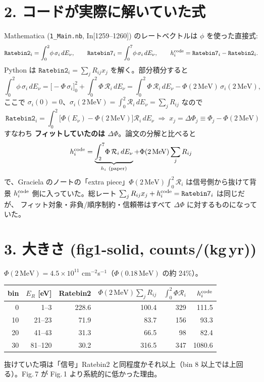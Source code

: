 \documentclass[11pt,a4paper]{ltjsarticle}
\newcommand{\Ev}{E_\nu}
\newcommand{\Phit}{\Phi(2\,\mathrm{MeV})}
\newcommand{\cR}{\mathcal{R}}
\begin{document}
\section*{2. コードが実際に解いていた式}
Mathematica (\texttt{1\_Main.nb}, In[1259--1260]) のレートベクトルは $\phi$ を使った直接式:
\begin{equation}
\texttt{Ratebin2}_i=\int_0^{2}\!\phi\,\sigma_i\,d\Ev,\qquad
\texttt{Ratebin7}_i=\int_0^{7}\!\phi\,\sigma_i\,d\Ev,\qquad
h_i^{\rm code}=\texttt{Ratebin7}_i-\texttt{Ratebin2}_i .
\end{equation}
Python は $\texttt{Ratebin2}_i=\sum_j R_{ij}x_j$ を解く。部分積分すると
\begin{equation}
\int_0^{2}\!\phi\,\sigma_i\,d\Ev
=\Big[-\Phi\,\sigma_i\Big]_0^{2}+\int_0^{2}\!\Phi\,\cR_i\,d\Ev
=\int_0^{2}\!\Phi\,\cR_i\,d\Ev-\Phit\,\sigma_i(2\,\mathrm{MeV}),
\end{equation}
ここで $\sigma_i(0)=0$、$\sigma_i(2\,\mathrm{MeV})=\int_0^{2}\cR_i\,d\Ev=\sum_j R_{ij}$ なので
\begin{equation}
\boxed{\ \texttt{Ratebin2}_i=\int_0^{2}\!\big[\Phi(\Ev)-\Phit\big]\cR_i\,d\Ev
\;\Longrightarrow\; x_j=\Delta\Phi_j\equiv\Phi_j-\Phit\ }
\end{equation}
すなわち \textbf{フィットしていたのは $\Delta\Phi$}。論文の分解と比べると
\begin{equation}
h_i^{\rm code}=\underbrace{\int_2^{7}\!\Phi\,\cR_i\,d\Ev}_{h_i\ (\text{paper})}+\Phit\sum_j R_{ij}
\end{equation}
で、Graciela のノートの「extra piece」$\Phit\!\int_0^2\!\cR_i$ は信号側から抜けて背景 $h_i^{\rm code}$ 側に入っていた。総レート $\sum_jR_{ij}x_j+h_i^{\rm code}=\texttt{Ratebin7}_i$ は同じだが、
フィット対象・非負/順序制約・信頼帯はすべて $\Delta\Phi$ に対するものになっていた。

\section*{3. 大きさ (fig1-solid, counts/(kg\,yr))}
$\Phit=4.5\times10^{11}$ cm$^{-2}$s$^{-1}$（$\Phi(0.18\,\mathrm{MeV})$ の約 24\%）。
\begin{center}\small
\begin{tabular}{r@{\ \ }r rrrr}
\toprule
bin & $E_R$ [eV] & Ratebin2 & $\Phit\sum_jR_{ij}$ & $\int_0^2\Phi\cR_i$ & $h_i^{\rm code}$\\
\midrule
0 & 1--3 & 228.6 & 100.4 & 329 & 111.5\\
10 & 21--23 & 71.9 & 83.7 & 156 & 93.3\\
20 & 41--43 & 31.3 & 66.5 & 98 & 82.4\\
30 & 81--120 & 30.2 & 316.5 & 347 & 1080.6\\
\bottomrule
\end{tabular}
\end{center}
抜けていた項は「信号」Ratebin2 と同程度かそれ以上（bin 8 以上では上回る）。Fig.\,7 が Fig.\,1 より系統的に低かった理由。
\end{document}
